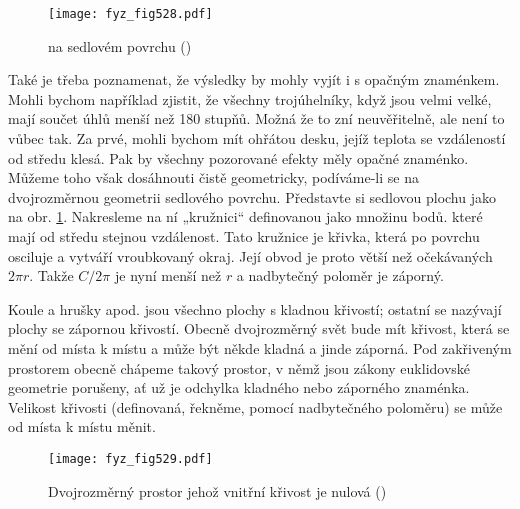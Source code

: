 {    \begin{figure}[ht!] %
      \centering
      \texttt{[image: fyz\_fig528.pdf]}
      \caption{ na sedlovém povrchu
               (\cite[s.~780]{Feynman02})}
      \label{fyz:fig528}
    \end{figure}
  
    Také je třeba poznamenat, že výsledky by mohly vyjít i s opačným znaménkem. Mohli bychom 
    například zjistit, že všechny trojúhelníky, když jsou velmi velké, mají součet úhlů menší než 
    \num{180} stupňů. Možná že to zní neuvěřitelně, ale není to vůbec tak. Za prvé, mohli bychom 
    mít ohřátou desku, jejíž teplota se vzdáleností od středu klesá. Pak by všechny pozorované 
    efekty měly opačné znaménko. Můžeme toho však dosáhnouti čistě geometricky, podíváme-li se na 
    dvojrozměrnou geometrii sedlového povrchu. Představte si sedlovou plochu jako na obr. 
    \ref{fyz:fig528}. Nakresleme na ní „kružnici“ definovanou jako množinu bodů. které mají od 
    středu stejnou vzdálenost. Tato kružnice je křivka, která po povrchu osciluje a vytváří 
    vroubkovaný okraj. Její obvod je proto větší než očekávaných \(2\pi r\). Takže \(C/2\pi\) je 
    nyní menší než \(r\) a nadbytečný  poloměr je záporný. 
    
    Koule a hrušky apod. jsou všechno plochy s kladnou křivostí; ostatní se nazývají plochy se 
    zápornou křivostí. Obecně dvojrozměrný svět bude mít křivost, která se mění od místa k místu a 
    může být někde kladná a jinde záporná. Pod zakřiveným prostorem obecně chápeme takový prostor, 
    v němž jsou zákony euklidovské geometrie porušeny, ať už je odchylka kladného nebo záporného 
    znaménka. Velikost křivosti (definovaná, řekněme, pomocí nadbytečného poloměru) se může od 
    místa k místu měnit.

    \begin{figure}[ht!] %
      \centering
      \texttt{[image: fyz\_fig529.pdf]}
      \caption{Dvojrozměrný prostor jehož vnitřní křivost je nulová
               (\cite[s.~781]{Feynman02})}
      \label{fyz:fig529}
    \end{figure}
  
}
